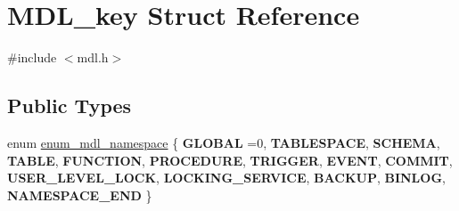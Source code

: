 \hypertarget{structMDL__key}{}\section{M\+D\+L\+\_\+key Struct Reference}
\label{structMDL__key}


{\ttfamily \#include $<$mdl.\+h$>$}

\subsection*{Public Types}
\begin{DoxyCompactItemize}
\item 
enum \mbox{\hyperlink{structMDL__key_a391ec4bd98fec6852a48f7856546ed3b}{enum\+\_\+mdl\+\_\+namespace}} \{ \newline
{\bfseries G\+L\+O\+B\+AL} =0, 
{\bfseries T\+A\+B\+L\+E\+S\+P\+A\+CE}, 
{\bfseries S\+C\+H\+E\+MA}, 
{\bfseries T\+A\+B\+LE}, 
\newline
{\bfseries F\+U\+N\+C\+T\+I\+ON}, 
{\bfseries P\+R\+O\+C\+E\+D\+U\+RE}, 
{\bfseries T\+R\+I\+G\+G\+ER}, 
{\bfseries E\+V\+E\+NT}, 
\newline
{\bfseries C\+O\+M\+M\+IT}, 
{\bfseries U\+S\+E\+R\+\_\+\+L\+E\+V\+E\+L\+\_\+\+L\+O\+CK}, 
{\bfseries L\+O\+C\+K\+I\+N\+G\+\_\+\+S\+E\+R\+V\+I\+CE}, 
{\bfseries B\+A\+C\+K\+UP}, 
\newline
{\bfseries B\+I\+N\+L\+OG}, 
{\bfseries N\+A\+M\+E\+S\+P\+A\+C\+E\+\_\+\+E\+ND}
 \}
\end{DoxyCompactItemize}
